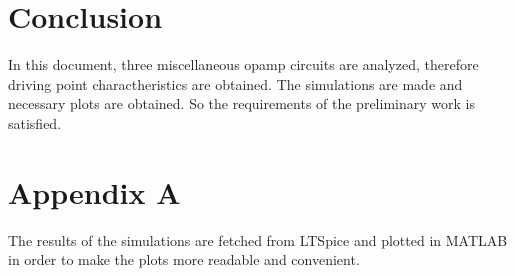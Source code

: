 \documentclass[letterpaper,12pt]{article}
\begin{document}
\section{Conclusion}
In this document, three miscellaneous opamp circuits are analyzed, therefore driving point charactheristics are obtained. The simulations are made and necessary plots are obtained.  So the requirements of the preliminary work is satisfied.


\section*{Appendix A}
The results of the simulations are fetched from LTSpice and plotted in MATLAB in order to make the plots more readable and convenient.
\end{document}
